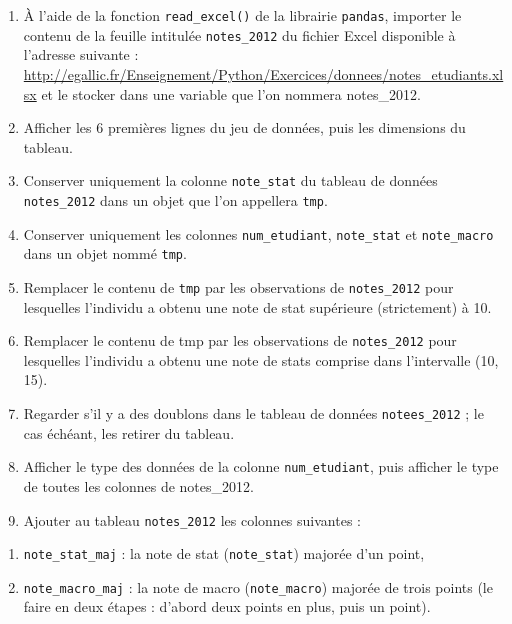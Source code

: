 \documentclass[12pt,]{book}
\providecommand{\tightlist}{%
  \setlength{\itemsep}{0pt}\setlength{\parskip}{0pt}}
\numberwithin{equation}{section}
\numberwithin{countremarque}{section}
\begin{document}
\begin{enumerate}
\def\labelenumi{\arabic{enumi}.}
\tightlist
\item
  À l'aide de la fonction \texttt{read\_excel()} de la librairie
  \texttt{pandas}, importer le contenu de la feuille intitulée
  \texttt{notes\_2012} du fichier Excel disponible à l'adresse suivante
  :
  \url{http://egallic.fr/Enseignement/Python/Exercices/donnees/notes_etudiants.xlsx}
  et le stocker dans une variable que l'on nommera notes\_2012.
\item
  Afficher les 6 premières lignes du jeu de données, puis les dimensions
  du tableau.
\item
  Conserver uniquement la colonne \texttt{note\_stat} du tableau de
  données \texttt{notes\_2012} dans un objet que l'on appellera
  \texttt{tmp}.
\item
  Conserver uniquement les colonnes \texttt{num\_etudiant},
  \texttt{note\_stat} et \texttt{note\_macro} dans un objet nommé
  \texttt{tmp}.
\item
  Remplacer le contenu de \texttt{tmp} par les observations de
  \texttt{notes\_2012} pour lesquelles l'individu a obtenu une note de
  stat supérieure (strictement) à 10.
\item
  Remplacer le contenu de tmp par les observations de
  \texttt{notes\_2012} pour lesquelles l'individu a obtenu une note de
  stats comprise dans l'intervalle (10, 15).
\item
  Regarder s'il y a des doublons dans le tableau de données
  \texttt{notees\_2012} ; le cas échéant, les retirer du tableau.
\item
  Afficher le type des données de la colonne \texttt{num\_etudiant},
  puis afficher le type de toutes les colonnes de notes\_2012.
\item
  Ajouter au tableau \texttt{notes\_2012} les colonnes suivantes :
\end{enumerate}

\begin{enumerate}
\def\labelenumi{(\alph{enumi})}
\tightlist
\item
  \texttt{note\_stat\_maj} : la note de stat (\texttt{note\_stat})
  majorée d'un point,
\item
  \texttt{note\_macro\_maj} : la note de macro (\texttt{note\_macro})
  majorée de trois points (le faire en deux étapes : d'abord deux points
  en plus, puis un point).
\end{enumerate}
\end{document}
